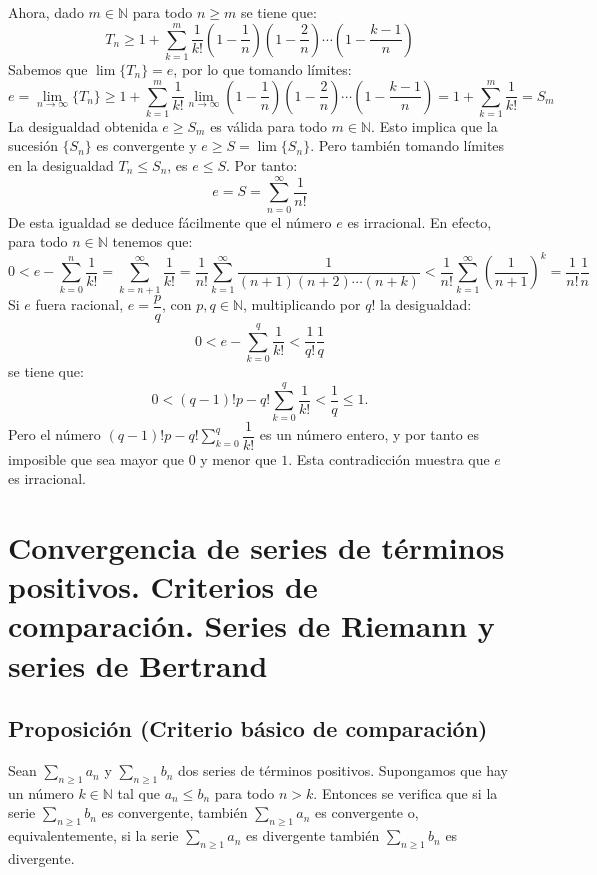 \documentclass[10pt,a4paper]{article}
\begin{document}
	Ahora, dado $m \in \mathbb{N}$ para todo $n \geq m$ se tiene que:
	$$ T_n \geq 1 + \sum_{k = 1} ^m \dfrac{1}{k!} \left(1 - \dfrac{1}{n}\right) \left(1 - \dfrac{2}{n}\right) \cdots \left(1 - \dfrac{k-1}{n}\right)$$
	Sabemos que $\lim\{T_n\} = e$, por lo que tomando límites:
	$$e = \lim_{n \rightarrow \infty}\{T_n\} \geq 1 + \sum_{k = 1}^m \dfrac{1}{k!} \lim_{n \rightarrow \infty} \left(1 - \dfrac{1}{n}\right) \left(1 - \dfrac{2}{n}\right) \cdots \left(1 - \dfrac{k-1}{n}\right) = 1 + \sum_{k = 1} ^m \dfrac{1}{k!} = S_m$$
	La desigualdad obtenida $e \geq S_m$ es válida para todo $m \in \mathbb{N}$. Esto implica que la sucesión $\{S_n\}$ es convergente y $e \geq S = \lim\{S_n\}$. Pero también tomando límites en la desigualdad $T_n \leq S_n$, es $e \leq S$. Por tanto:
	$$ e = S = \sum_{n = 0} ^ \infty \dfrac{1}{n!}$$
	De esta igualdad se deduce fácilmente que el número $e$ es irracional. En efecto, para todo $n \in \mathbb{N}$ tenemos que:
	$$ 0 < e - \sum_{k = 0} ^n \dfrac{1}{k!} = \sum_{k = n+1}^\infty \dfrac{1}{k!} = \dfrac{1}{n!} \sum_{k = 1}^\infty \dfrac{1}{(n+1)(n+2)\cdots (n+k)} < \dfrac{1}{n!} \sum_{k = 1} ^\infty \left(\dfrac{1}{n+1}\right) ^k = \dfrac{1}{n!} \dfrac{1}{n}$$
	Si $e$ fuera racional, $e = \dfrac{p}{q}$, con $p, q \in \mathbb{N}$, multiplicando por $q!$ la desigualdad: 
	$$ 0 < e - \sum_{k = 0} ^q \dfrac{1}{k!} < \dfrac{1}{q!}\dfrac{1}{q}$$
	se tiene que:
	$$0 < (q-1)!p-q! \sum_{k = 0} ^q \dfrac{1}{k!} < \dfrac{1}{q} \leq 1.$$
	Pero el número $\displaystyle(q-1)!p-q! \sum_{k = 0} ^q \dfrac{1}{k!}$ es un número entero, y por tanto es imposible que sea mayor que $0$ y menor que $1$. Esta contradicción muestra que $e$ es irracional.
	
	\newpage
	
	\section{ Convergencia de series de términos positivos. Criterios de comparación. Series de Riemann y series de Bertrand}
	
	\subsection{Proposición (Criterio básico de comparación)}
	
	Sean $\displaystyle\sum_{n \geq 1}a_n$ y $\displaystyle\sum_{n \geq 1}b_n$ dos series de términos positivos. Supongamos que hay un número $k \in \mathbb{N}$ tal que $a_n \leq b_n$ para todo $n > k$. Entonces se verifica que si la serie $\displaystyle\sum_{n \geq 1}b_n$ es convergente, también $\displaystyle\sum_{n \geq 1}a_n$ es convergente o, equivalentemente, si la serie $\displaystyle\sum_{n \geq 1}a_n$ es divergente también $\displaystyle\sum_{n \geq 1}b_n$ es divergente.
	
\end{document}
